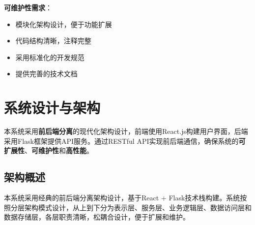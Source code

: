 \documentclass[12pt,a4paper]{article}
\begin{document}
\textbf{可维护性需求}：
\begin{itemize}
    \item 模块化架构设计，便于功能扩展
    \item 代码结构清晰，注释完整
    \item 采用标准化的开发规范
    \item 提供完善的技术文档
\end{itemize}

\section{系统设计与架构}

\begin{infobox}[title={系统架构设计核心理念}]
本系统采用\textbf{前后端分离}的现代化架构设计，前端使用React.js构建用户界面，后端采用Flask框架提供API服务。通过RESTful API实现前后端通信，确保系统的\textcolor{primary}{\textbf{可扩展性}}、\textcolor{secondary}{\textbf{可维护性}}和\textcolor{success}{\textbf{高性能}}。
\end{infobox}

\subsection{架构概述}
本系统采用经典的前后端分离架构设计，基于React + Flask技术栈构建。系统按照分层架构模式设计，从上到下分为表示层、服务层、业务逻辑层、数据访问层和数据存储层，各层职责清晰，松耦合设计，便于扩展和维护。
\end{document}
